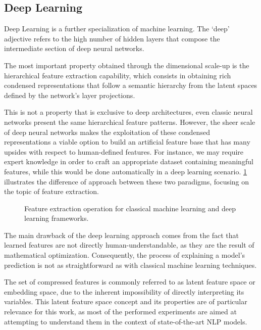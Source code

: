 \subsection{Deep Learning}

Deep Learning is a further specialization of machine learning.
The `deep' adjective refers to the high number of hidden layers that compose the intermediate section of deep neural networks.

The most important property obtained through the dimensional scale-up is the hierarchical feature extraction capability, which consists in obtaining rich condensed representations that follow a semantic hierarchy from the latent spaces defined by the network's layer projections.

This is not a property that is exclusive to deep architectures, even classic neural networks present the same hierarchical feature patterns.
However, the sheer scale of deep neural networks makes the exploitation of these condensed representations a viable option to build an artificial feature base that has many upsides with respect to human-defined features.
For instance, we may require expert knowledge in order to craft an appropriate dataset containing meaningful features, while this would be done automatically in a deep learning scenario.
\cref{fig:background_fex_deep-fex} illustrates the difference of approach between these two paradigms, focusing on the topic of feature extraction.

\begin{figure}[t!]
    \centering
    \caption{Feature extraction operation for classical machine learning and deep learning frameworks.}
    \label{fig:background_fex_deep-fex}
\end{figure}

The main drawback of the deep learning approach comes from the fact that learned features are not directly human-understandable, as they are the result of mathematical optimization.
Consequently, the process of explaining a model's prediction is not as straightforward as with classical machine learning techniques.

The set of compressed features is commonly referred to as latent feature space or embedding space, due to the inherent impossibility of directly interpreting its variables.
This latent feature space concept and its properties are of particular relevance for this work, as most of the performed experiments are aimed at attempting to understand them in the context of state-of-the-art NLP models.

